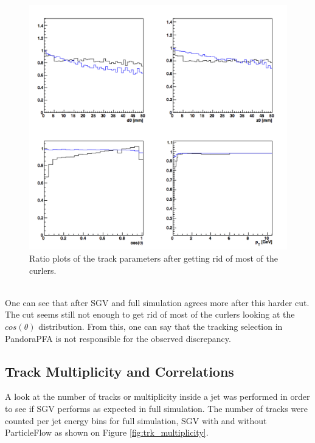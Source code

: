 \documentclass[a4paper,12pt]{article}
\begin{document}
\begin{minipage}{\linewidth}
\begin{minipage}{0.4\linewidth}
\begin{figure}[H]
    \includegraphics[width=\linewidth]{eff_track_selection_wocurlers.png} 
 \caption{Ratio plots of the track parameters after getting rid of most of the curlers.}
   \label{fig:trk_select_wocurlers}
\end{figure}
\end{minipage}
\end{minipage}\\[0.4cm]

\noindent
One can see that after SGV and full simulation agrees more after this harder cut. The cut seems still not enough to get rid of most of the curlers looking at the $cos(\theta)$ distribution. From this, one can say that the tracking selection in PandoraPFA is not responsible for the observed discrepancy. 

\subsection{Track Multiplicity and Correlations}

A look at the number of tracks or multiplicity inside a jet was performed in order to see if SGV performs as expected in full simulation. The number of tracks were counted per jet energy bins for full simulation, SGV with and without ParticleFlow as shown on Figure \ref{fig:trk_multiplicity}. 
\end{document}
